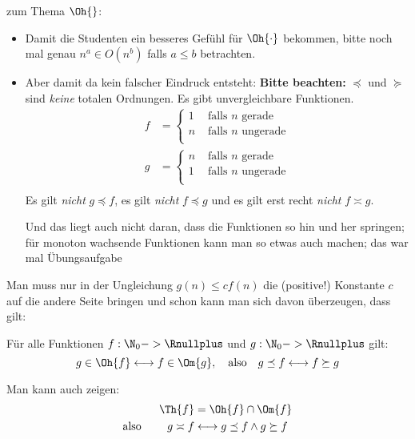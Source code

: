 %
\begin{tutorium}
  zum Thema $\Oh{}$:
  \begin{itemize}
  \item Damit die Studenten ein besseres Gefühl für $\Oh{\cdot}$
    bekommen, bitte noch mal genau $n^a\in O(n^b)$ falls $a\leq b$
    betrachten.
  \item Aber damit da kein falscher Eindruck entsteht: \textbf{Bitte
      beachten:} $\preceq$ und $\succeq$ sind \emph{keine} totalen
    Ordnungen. Es gibt unvergleichbare Funktionen. \ZB
    \begin{align*}
      f &=
      \begin{cases}
        1 & \text{ falls $n$ gerade} \\
        n & \text{ falls $n$ ungerade} \\
      \end{cases} \\
      g &=
      \begin{cases}
        n & \text{ falls $n$ gerade} \\
        1 & \text{ falls $n$ ungerade} \\
      \end{cases} \\
    \end{align*}
    Es gilt \emph{nicht} $g\preceq f$, es gilt \emph{nicht} $f\preceq
    g$ und es gilt erst recht \emph{nicht} $f\asymp g$.

    Und das liegt auch nicht daran, dass die Funktionen so hin und her
    springen; für monoton wachsende Funktionen kann man so etwas auch
    machen; das war mal Übungsaufgabe
  \end{itemize}
\end{tutorium}

\noindent
Man muss nur in der Ungleichung $g(n) \leq c f(n)$ die (positive!)
Konstante $c$ auf die andere Seite bringen und schon kann man sich
davon überzeugen, dass gilt:

\begin{punkt}[Rechenregel]
Für alle Funktionen $f:\N_0->\Rnullplus$ und $g:\N_0->\Rnullplus$  gilt:
\[
g\in\Oh{f} \longleftrightarrow f \in\Om{g}, \text{\quad also\quad} g\preceq f \longleftrightarrow f \succeq g
\]
\end{punkt}
% 
Man kann auch zeigen: 
\begin{align*}
\Th{f} &= \Oh{f} \cap \Om{f} \\
\text{also \qquad} g\asymp f &\longleftrightarrow g\preceq f \land g \succeq f
\end{align*}

